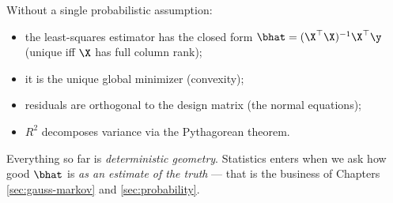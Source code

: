 \begin{keybox}
Without a single probabilistic assumption:
\begin{itemize}
  \item the least-squares estimator has the closed form $\bhat = (\X^\top \X)^{-1} \X^\top \y$ (unique iff $\X$ has full column rank);
  \item it is the unique global minimizer (convexity);
  \item residuals are orthogonal to the design matrix (the normal equations);
  \item $R^2$ decomposes variance via the Pythagorean theorem.
\end{itemize}
Everything so far is \emph{deterministic geometry}. Statistics enters when we ask how good $\bhat$ is \emph{as an estimate of the truth} — that is the business of Chapters \ref{sec:gauss-markov} and \ref{sec:probability}.
\end{keybox}
